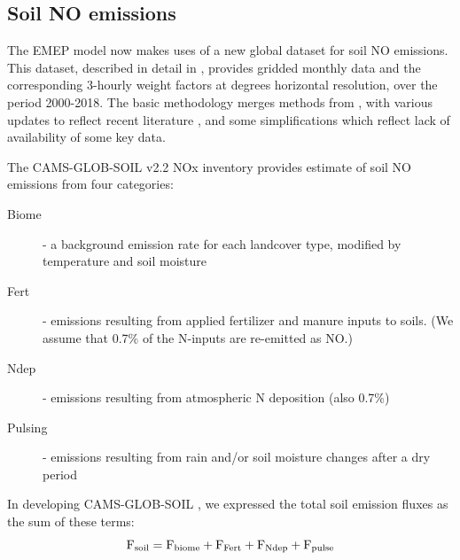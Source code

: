 \subsection{Soil NO emissions}
\label{ssec:soilNO}

The EMEP model now makes uses of a new global dataset for soil NO
emissions. This dataset, described in detail in \citet{SimpsonDarras:2021},
provides gridded monthly data and the corresponding 3-hourly
weight factors at  degrees horizontal resolution, over
the period 2000-2018.  The basic methodology merges methods from
\citet{YiengerLevy:1995}, with various updates to reflect recent
literature \citep[especially][]{SteinkampLawrence2011}, and some
simplifications which reflect lack of  availability of some key data.



The CAMS-GLOB-SOIL v2.2 NOx inventory
provides estimate of soil NO emissions from four categories:

\begin{description}
  \item[Biome] - a background emission rate for each landcover type, modified by temperature
and soil moisture %
  \item[Fert] - emissions resulting from applied fertilizer and manure inputs to soils. (We assume
that  0.7\% of the N-inputs are re-emitted as NO.)
  \item[Ndep] - emissions resulting from atmospheric N deposition (also 0.7\%)
  \item[Pulsing] - emissions resulting from rain and/or soil moisture changes after
    a dry period
\end{description}

In developing CAMS-GLOB-SOIL , we  expressed the total soil emission fluxes as the sum
of these terms:
\begin{equation}
  \mbox{F}_{\scriptsize \mbox{soil}} = \mbox{F}_{\scriptsize \mbox{biome}}  + \mbox{F}_{\scriptsize \mbox{Fert}} + \mbox{F}_{\scriptsize \mbox{Ndep}} + \mbox{F}_{\scriptsize \mbox{pulse}}
  \label{eqn:Fs}
\end{equation}

